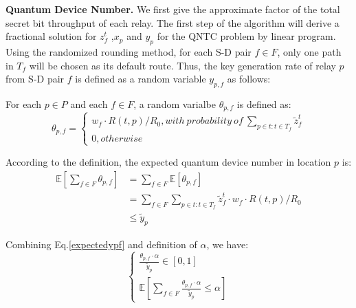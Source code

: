\textbf{Quantum Device Number.} We first give the approximate factor of the total secret bit throughput of each relay. The first step of the algorithm will derive a fractional solution for $z_f^t$ ,$x_p$ and $y_p$ for the QNTC problem by linear program. Using the randomized rounding method, for each S-D pair $f \in F$, only one path in $T_f$ will be chosen as its default route. Thus, the key generation rate of relay $p$ from S-D pair $f$ is defined as a random variable $y_{p,f}$ as follows:
\begin{definition}\label{def1}
For each $p \in P$ and each $f \in F$, a random varialbe $\theta_{p,f}$ is defined as:
\begin{equation}\label{ypf}
\theta_{p,f}=
\begin{cases}
   w_f \cdot R(t,p)/R_0, with \ probability \ of \ \sum_{p \in t:t \in T_f}\widetilde{z}_f^t \\
   0, otherwise
\end{cases}
\end{equation}

\end{definition}

According to the definition, the expected quantum device number in location $p$ is:
\begin{equation}\label{expectedypf}
\begin{aligned}
  \mathbb{E}[\sum_{f \in F}\theta_{p,f}] &= \sum_{f \in F}\mathbb{E}[\theta_{p,f}] \\
  & = \sum_{f \in F}\sum_{p \in t:t \in T_f}\widetilde{z}_f^t \cdot w_f  \cdot R(t,p) / R_0 \\
  & \le \widetilde{y}_p
\end{aligned}
\end{equation}

Combining Eq.\ref{expectedypf} and definition of $\alpha$, we have:
\begin{equation}\label{eq:relaxed}
	\begin{cases}
     \frac{\theta_{p,f} \cdot \alpha}{\widetilde{y}_p} \in [0,1] \\
     \mathbb{E}[\sum_{f \in F} \frac{\theta_{p,f} \cdot \alpha}{\widetilde{y}_p} \le \alpha]
	\end{cases}
\end{equation}

